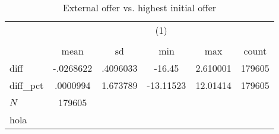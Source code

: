 \begin{table}[htbp]\centering
\def\sym#1{\ifmmode^{#1}\else\(^{#1}\)\fi}
\caption{External offer vs. highest initial offer}
\begin{tabular}{l*{1}{ccccc}}
\hline\hline
            &\multicolumn{5}{c}{(1)}                                         \\
            &\multicolumn{5}{c}{}                                            \\
            &        mean&          sd&         min&         max&       count\\
\hline
diff        &   -.0268622&    .4096033&      -16.45&    2.610001&      179605\\
diff\_pct    &    .0000994&    1.673789&   -13.11523&    12.01414&      179605\\
\hline
\(N\)       &      179605&            &            &            &            \\
\hline\hline
\multicolumn{6}{l}{\footnotesize hola}\\
\end{tabular}
\end{table}
